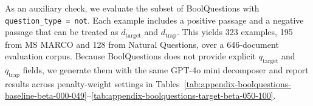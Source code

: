 \documentclass[11pt]{article}
\begin{document}
As an auxiliary check, we evaluate the subset of BoolQuestions \citep{zhang2024boolquestionsdoesdenseretrieval} with \texttt{question\_type = not}.
Each example includes a positive passage and a negative passage that can be treated as $d_{\mathrm{target}}$ and $d_{\mathrm{trap}}$.
This yields 323 examples, 195 from MS MARCO and 128 from Natural Questions, over a 646-document evaluation corpus.
Because BoolQuestions does not provide explicit $q_{\mathrm{target}}$ and $q_{\mathrm{trap}}$ fields, we generate them with the same GPT-4o mini decomposer and report results across penalty-weight settings in Tables~\ref{tab:appendix-boolquestions-baseline-beta-000-049}--\ref{tab:appendix-boolquestions-target-beta-050-100}.


\end{document}
